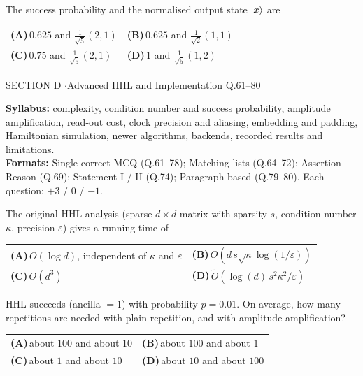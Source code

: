 \documentclass[11pt,a4paper]{article}
\newcommand{\optlabel}[1]{\textbf{(#1)}}
\newenvironment{qitem}[1]{\begin{list}{}{\setlength{\leftmargin}{3.3em}\setlength{\labelwidth}{3.1em}%
  \setlength{\labelsep}{0.2em}\setlength{\topsep}{3pt}\setlength{\parsep}{3pt}}\item[\textbf{Q.#1}\hfill]}{\end{list}}
\newcommand{\qsep}{\par\vspace{2pt}{\color{black!15}\hrule}\vspace{4pt}}
\begin{document}
\begin{qitem}{60}
The success probability and the normalised output state $\ket x$ are
\par\smallskip\noindent\begin{tabularx}{\linewidth}{@{}*{2}{L}@{}}
\optlabel{A}\,$0.625$ and $\tfrac{1}{\sqrt5}(2, 1)$ & \optlabel{B}\,$0.625$ and $\tfrac{1}{\sqrt2}(1, 1)$ \\[3pt]
\optlabel{C}\,$0.75$ and $\tfrac{1}{\sqrt5}(2, 1)$ & \optlabel{D}\,$1$ and $\tfrac{1}{\sqrt5}(1, 2)$
\end{tabularx}
\end{qitem}
\qsep

\newpage

\begin{sectionbanner}SECTION D \enspace$\cdot$\enspace Advanced HHL and Implementation \hfill Q.61--80\end{sectionbanner}

{\small \textbf{Syllabus:} complexity, condition number and success probability, amplitude amplification, read-out cost, clock precision and aliasing, embedding and padding, Hamiltonian simulation, newer algorithms, backends, recorded results and limitations.\\ \textbf{Formats:} Single-correct MCQ (Q.61--78); Matching lists (Q.64--72); Assertion--Reason (Q.69); Statement I / II (Q.74); Paragraph based (Q.79--80). Each question: $+3$ / $0$ / $-1$.}
\par\medskip

\begin{qitem}{61}
The original HHL analysis (sparse $d\times d$ matrix with sparsity $s$, condition number $\kappa$, precision $\varepsilon$) gives a running time of
\par\smallskip\noindent\begin{tabularx}{\linewidth}{@{}*{2}{L}@{}}
\optlabel{A}\,$O(\log d)$, independent of $\kappa$ and $\varepsilon$ & \optlabel{B}\,$O(d\,s\sqrt\kappa\log(1/\varepsilon))$ \\[3pt]
\optlabel{C}\,$O(d^3)$ & \optlabel{D}\,$\tilde O\!\left(\log(d)\,s^2\kappa^2/\varepsilon\right)$
\end{tabularx}
\end{qitem}
\qsep

\begin{qitem}{62}
HHL succeeds (ancilla $= 1$) with probability $p = 0.01$. On average, how many repetitions are needed with plain repetition, and with amplitude amplification?
\par\smallskip\noindent\begin{tabularx}{\linewidth}{@{}*{2}{L}@{}}
\optlabel{A}\,about $100$ and about $10$ & \optlabel{B}\,about $100$ and about $1$ \\[3pt]
\optlabel{C}\,about $1$ and about $10$ & \optlabel{D}\,about $10$ and about $100$
\end{tabularx}
\end{qitem}
\qsep
\end{document}
